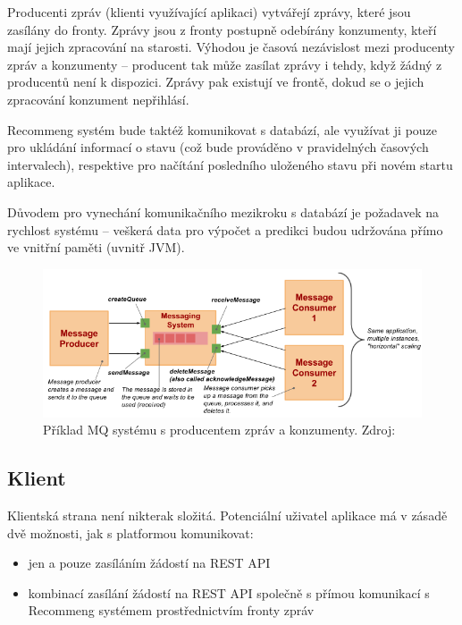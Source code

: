 \documentclass[thesis=M,czech]{FITthesis}[2014/05/07]
\begin{document}
Producenti zpráv (klienti využívající aplikaci) vytvářejí zprávy, které jsou zasílány do fronty. Zprávy jsou z fronty postupně odebírány konzumenty, kteří mají jejich zpracování na starosti. Výhodou je časová nezávislost mezi producenty zpráv a konzumenty – producent tak může zasílat zprávy i tehdy, když žádný z producentů není k dispozici. Zprávy pak existují ve frontě, dokud se o jejich zpracování konzument nepřihlásí.

Recommeng systém bude taktéž komunikovat s databází, ale využívat ji pouze pro ukládání informací o stavu (což bude prováděno v pravidelných časových intervalech), respektive pro načítání posledního uloženého stavu při novém startu aplikace.

Důvodem pro vynechání komunikačního mezikroku s databází je požadavek na rychlost systému – veškerá data pro výpočet a predikci budou udržována přímo ve vnitřní paměti (uvnitř JVM). 

\begin{figure}\centering
	\includegraphics[width=1.2\textwidth]{obr/vitvar_mq.png}
 	\caption[Příklad MQ systému s producentem zpráv a konzumenty]{Příklad MQ systému s producentem zpráv a konzumenty. Zdroj: \cite{vitvarMq}}\label{fig:vitvarMq}
\end{figure}	

\subsection{Klient}

Klientská strana není nikterak složitá. Potenciální uživatel aplikace má v zásadě dvě možnosti, jak s platformou komunikovat:

\begin{itemize}
	\item jen a pouze zasíláním žádostí na REST API
	\item kombinací zasílání žádostí na REST API společně s přímou komunikací s Recommeng systémem prostřednictvím fronty zpráv
\end{itemize}
\end{document}
